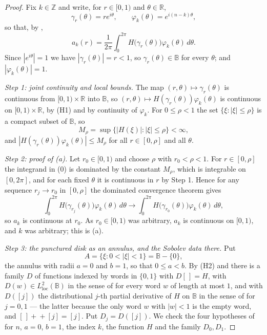 \begin{proof}
Fix $k\in\mathbb{Z}$ and write, for $r\in[0,1)$ and $\theta\in\mathbb{R}$,
\[
  \gamma_r(\theta)=re^{i\theta},\qquad \varphi_k(\theta)=e^{i(n-k)\theta},
\]
so that, by ,
\begin{equation}\tag{0}
  a_k(r)=\frac1{2\pi}\int_0^{2\pi}H\bigl(\gamma_r(\theta)\bigr)\varphi_k(\theta)\,d\theta .
\end{equation}
Since $|e^{i\theta}|=1$ we have $|\gamma_r(\theta)|=r<1$, so
$\gamma_r(\theta)\in\mathbb{B}$ for every $\theta$; and $|\varphi_k(\theta)|=1$.

\emph{Step 1: joint continuity and local bounds.}  The map
$(r,\theta)\mapsto\gamma_r(\theta)$ is continuous from $[0,1)\times\mathbb{R}$
into $\mathbb{B}$, so $(r,\theta)\mapsto H(\gamma_r(\theta))\varphi_k(\theta)$
is continuous on $[0,1)\times\mathbb{R}$, by (H1) and by continuity of
$\varphi_k$.  For $0\le\rho<1$ the set $\{\xi:|\xi|\le\rho\}$ is a compact
subset of $\mathbb{B}$, so
\[
  M_\rho=\sup\bigl\{|H(\xi)|:|\xi|\le\rho\bigr\}<\infty,
\]
and $|H(\gamma_r(\theta))\varphi_k(\theta)|\le M_\rho$ for all $r\in[0,\rho]$
and all $\theta$.

\emph{Step 2: proof of (a).}  Let $r_0\in[0,1)$ and choose $\rho$ with
$r_0<\rho<1$.  For $r\in[0,\rho]$ the integrand in (0) is dominated by the
constant $M_\rho$, which is integrable on $[0,2\pi]$, and for each fixed
$\theta$ it is continuous in $r$ by Step 1.  Hence for any sequence
$r_j\to r_0$ in $[0,\rho]$ the dominated convergence theorem gives
\[
  \int_0^{2\pi}H\bigl(\gamma_{r_j}(\theta)\bigr)\varphi_k(\theta)\,d\theta
  \longrightarrow
  \int_0^{2\pi}H\bigl(\gamma_{r_0}(\theta)\bigr)\varphi_k(\theta)\,d\theta,
\]
so $a_k$ is continuous at $r_0$.  As $r_0\in[0,1)$ was arbitrary, $a_k$ is
continuous on $[0,1)$, and $k$ was arbitrary; this is (a).

\emph{Step 3: the punctured disk as an annulus, and the Sobolev data there.}
Put
\[
  A=\{\xi:0<|\xi|<1\}=\mathbb{B}-\{0\},
\]
the annulus with radii $a=0$ and $b=1$, so that $0\le a<b$.  By (H2) and
 there is a family $D$ of functions indexed by words in
$\{0,1\}$ with $D[\,]=H$, with $D(w)\in L^{2}_{\mathrm{loc}}(\mathbb{B})$ in the
sense of  for every word $w$ of length at most $1$, and
with $D([j])$ the distributional $j$-th partial derivative of $H$ on
$\mathbb{B}$ in the sense of  for $j=0,1$ --- the
latter because the only word $w$ with $|w|<1$ is the empty word, and
$[\,]+\!\!+[j]=[j]$.  Put $D_j=D([j])$.  We check the four hypotheses of
 for $n$, $a=0$, $b=1$, the index $k$, the
function $H$ and the family $D_0,D_1$.


\end{proof}

